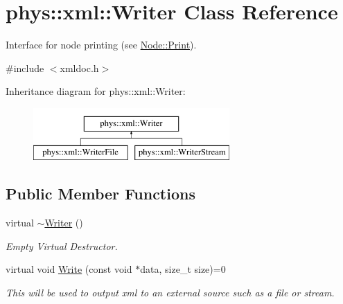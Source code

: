 \hypertarget{classphys_1_1xml_1_1Writer}{
\section{phys::xml::Writer Class Reference}
\label{d2/d28/classphys_1_1xml_1_1Writer}
}


Interface for node printing (see \hyperlink{classphys_1_1xml_1_1Node_adbe10968a804a94552e1dc8223744406}{Node::Print}).  




{\ttfamily \#include $<$xmldoc.h$>$}

Inheritance diagram for phys::xml::Writer:\begin{figure}[H]
\begin{center}
\leavevmode
\includegraphics[height=2.000000cm]{d2/d28/classphys_1_1xml_1_1Writer}
\end{center}
\end{figure}
\subsection*{Public Member Functions}
\begin{DoxyCompactItemize}
\item 
\hypertarget{classphys_1_1xml_1_1Writer_a527c2e01738b1e570d08674eada21800}{
virtual \hyperlink{classphys_1_1xml_1_1Writer_a527c2e01738b1e570d08674eada21800}{$\sim$Writer} ()}
\label{d2/d28/classphys_1_1xml_1_1Writer_a527c2e01738b1e570d08674eada21800}

\begin{DoxyCompactList}\small\item\em Empty Virtual Destructor. \item\end{DoxyCompactList}\item 
virtual void \hyperlink{classphys_1_1xml_1_1Writer_ab6d4758ab53743f236eb64d5b2dd7e9e}{Write} (const void $\ast$data, size\_\-t size)=0
\begin{DoxyCompactList}\small\item\em This will be used to output xml to an external source such as a file or stream. \item\end{DoxyCompactList}\end{DoxyCompactItemize}


